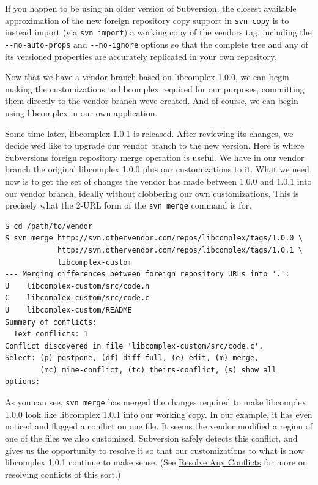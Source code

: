 If you happen to be using an older version of Subversion, the closest
available approximation of the new foreign repository copy support in
\texttt{svn\ copy} is to instead import (via \texttt{svn\ import}) a
working copy of the vendor\textquotesingle s tag, including the
\texttt{-\/-no-auto-props} and \texttt{-\/-no-ignore} options so that
the complete tree and any of its versioned properties are accurately
replicated in your own repository.

Now that we have a vendor branch based on libcomplex 1.0.0, we can begin
making the customizations to libcomplex required for our purposes,
committing them directly to the vendor branch we\textquotesingle ve
created. And of course, we can begin using libcomplex in our own
application.

Some time later, libcomplex 1.0.1 is released. After reviewing its
changes, we decide we\textquotesingle d like to upgrade our vendor
branch to the new version. Here is where Subversion\textquotesingle s
foreign repository merge operation is useful. We have in our vendor
branch the original libcomplex 1.0.0 plus our customizations to it. What
we need now is to get the set of changes the vendor has made between
1.0.0 and 1.0.1 into our vendor branch, ideally without clobbering our
own customizations. This is precisely what the 2-URL form of the
\texttt{svn\ merge} command is for.

\begin{verbatim}
$ cd /path/to/vendor
$ svn merge http://svn.othervendor.com/repos/libcomplex/tags/1.0.0 \
            http://svn.othervendor.com/repos/libcomplex/tags/1.0.1 \
            libcomplex-custom
--- Merging differences between foreign repository URLs into '.':
U    libcomplex-custom/src/code.h
C    libcomplex-custom/src/code.c
U    libcomplex-custom/README
Summary of conflicts:
  Text conflicts: 1
Conflict discovered in file 'libcomplex-custom/src/code.c'.
Select: (p) postpone, (df) diff-full, (e) edit, (m) merge,
        (mc) mine-conflict, (tc) theirs-conflict, (s) show all options: 
\end{verbatim}

As you can see, \texttt{svn\ merge} has merged the changes required to
make libcomplex 1.0.0 look like libcomplex 1.0.1 into our working copy.
In our example, it has even noticed and flagged a conflict on one file.
It seems the vendor modified a region of one of the files we also
customized. Subversion safely detects this conflict, and gives us the
opportunity to resolve it so that our customizations to what is now
libcomplex 1.0.1 continue to make sense. (See
\hyperref[svn.tour.cycle.resolve]{Resolve Any Conflicts} for more on
resolving conflicts of this sort.)

